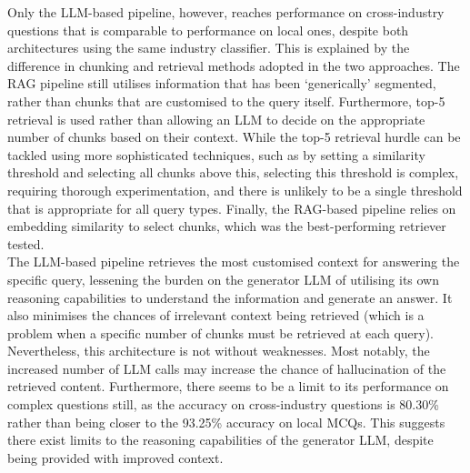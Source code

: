 Only the LLM-based pipeline, however, reaches performance on cross-industry questions that is comparable to performance on local ones, despite both architectures using the same industry classifier. This is explained by the difference in chunking and retrieval methods adopted in the two approaches. The RAG pipeline still utilises information that has been `generically' segmented, rather than chunks that are customised to the query itself. Furthermore, top-5 retrieval is used rather than allowing an LLM to decide on the appropriate number of chunks based on their context. While the top-5 retrieval hurdle can be tackled using more sophisticated techniques, such as by setting a similarity threshold and selecting all chunks above this, selecting this threshold is complex, requiring thorough experimentation, and there is unlikely to be a single threshold that is appropriate for all query types. Finally, the RAG-based pipeline relies on embedding similarity to select chunks, which was the best-performing retriever tested.\\

The LLM-based pipeline retrieves the most customised context for answering the specific query, lessening the burden on the generator LLM of utilising its own reasoning capabilities to understand the information and generate an answer. It also minimises the chances of irrelevant context being retrieved (which is a problem when a specific number of chunks must be retrieved at each query). Nevertheless, this architecture is not without weaknesses. Most notably, the increased number of LLM calls may increase the chance of hallucination of the retrieved content. Furthermore, there seems to be a limit to its performance on complex questions still, as the accuracy on cross-industry questions is 80.30\% rather than being closer to the 93.25\% accuracy on local MCQs. This suggests there exist limits to the reasoning capabilities of the generator LLM, despite being provided with improved context.
